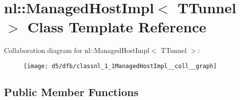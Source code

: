 \hypertarget{classnl_1_1ManagedHostImpl}{}\section{nl\+:\+:Managed\+Host\+Impl$<$ T\+Tunnel $>$ Class Template Reference}
\label{classnl_1_1ManagedHostImpl}


Collaboration diagram for nl\+:\+:Managed\+Host\+Impl$<$ T\+Tunnel $>$\+:\nopagebreak
\begin{figure}[H]
\begin{center}
\leavevmode
\texttt{[image: d5/dfb/classnl\_1\_1ManagedHostImpl\_\_coll\_\_graph]}
\end{center}
\end{figure}
\subsection*{Public Member Functions}
